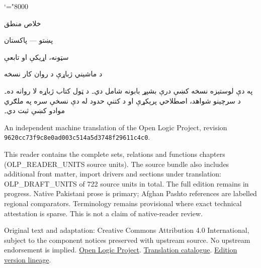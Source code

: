 \documentclass[12pt,a4paper,oneside]{report}
\begin{document}
\setRTL
\mathcode`\!="8000
\begin{titlepage}
\begin{center}
\vspace*{25mm}
{\Huge خلاص منطق}\par\bigskip
{\Large پښتو — پاکستان}\par\bigskip
{\LARGE سټونه، اړيکې او تابعې}\par\bigskip
د ماشيني ژباړې د روان کار نسخه
\end{center}
\bigskip
په دې لوستيزه نسخه کښې درې بشپړ بابونه شامل دي۔ د ټول کتاب ژباړه لا
روانه ده۔ د سرچينو شواهد، اصطلاحي پرېکړې او د کتنې حدود له دې نسخې
سره په ملګري موادو کښې ثبت دي۔
\begin{LTR}\latinfont\small
An independent machine translation of the Open Logic Project, revision\\
\texttt{9620cc73f9c8e0ad003c514a5d3748f29611c4c0}.\par
This reader contains the complete sets, relations and functions chapters (OLP_READER_UNITS source
units). The source bundle also includes additional front matter, import drivers
and sections under translation: OLP_DRAFT_UNITS of 722 source units in total.
The full edition remains in progress.
Native Pakistani prose is primary; Afghan Pashto references are labelled
regional comparators. Terminology remains provisional where exact technical
attestation is sparse. This is not a claim of native-reader review.

Original text and adaptation: Creative Commons Attribution 4.0 International,
subject to the component notices preserved with upstream source.
No upstream endorsement is implied.
\href{https://openlogicproject.org/}{Open Logic Project}.\quad
\href{https://github.com/KokunoYumeto/OpenLogic-translations}{Translation catalogue}.\quad
\href{https://doi.org/10.5281/zenodo.22307197}{Edition version lineage}.
\end{LTR}
\end{titlepage}
\tableofcontents
\clearpage
\end{document}
